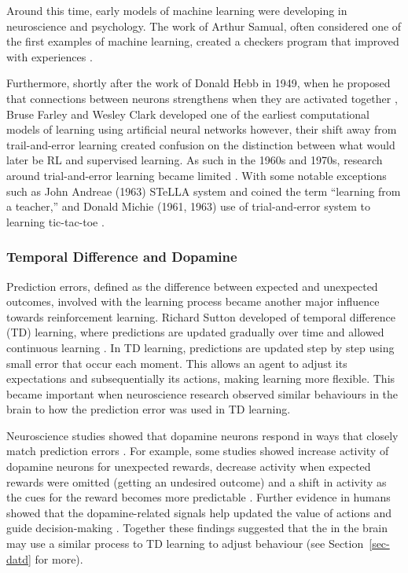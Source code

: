 \documentclass[
  authoryear,
  preprint]{elsarticle}
\begin{document}
Around this time, early models of machine learning were developing in
neuroscience and psychology. The work of Arthur Samual, often considered
one of the first examples of machine learning, created a checkers
program that improved with experiences \citep{Samuel1959}.

Furthermore, shortly after the work of Donald Hebb in 1949, when he
proposed that connections between neurons strengthens when they are
activated together \citep{Hebb1949}, Bruse Farley and Wesley Clark
developed one of the earliest computational models of learning using
artificial neural networks \citep{Clark1955} however, their shift away
from trail-and-error learning created confusion on the distinction
between what would later be RL and supervised learning. As such in the
1960s and 1970s, research around trial-and-error learning became limited
\citep{SuttonBarto2020}. With some notable exceptions such as John
Andreae (1963) STeLLA system and coined the term ``learning from a
teacher,'' and Donald Michie (1961, 1963) use of trial-and-error system
to learning tic-tac-toe \citep{SuttonBarto2020}.

\subsubsection{Temporal Difference and
Dopamine}\label{temporal-difference-and-dopamine}

Prediction errors, defined as the difference between expected and
unexpected outcomes, involved with the learning process became another
major influence towards reinforcement learning. Richard Sutton developed
of temporal difference (TD) learning, where predictions are updated
gradually over time and allowed continuous learning \citep{Sutton1988}.
In TD learning, predictions are updated step by step using small error
that occur each moment. This allows an agent to adjust its expectations
and subsequentially its actions, making learning more flexible. This
became important when neuroscience research observed similar behaviours
in the brain to how the prediction error was used in TD learning.

Neuroscience studies showed that dopamine neurons respond in ways that
closely match prediction errors \citep{Schultz1997}. For example, some
studies showed increase activity of dopamine neurons for unexpected
rewards, decrease activity when expected rewards were omitted (getting
an undesired outcome) and a shift in activity as the cues for the reward
becomes more predictable \citep{Schultz1997, Mirenowicz1994, Bayer2005}.
Further evidence in humans showed that the dopamine-related signals help
updated the value of actions and guide decision-making
\citep{Pessiglione2006}. Together these findings suggested that the in
the brain may use a similar process to TD learning to adjust behaviour
(see Section~\ref{sec-datd} for more).
\end{document}
